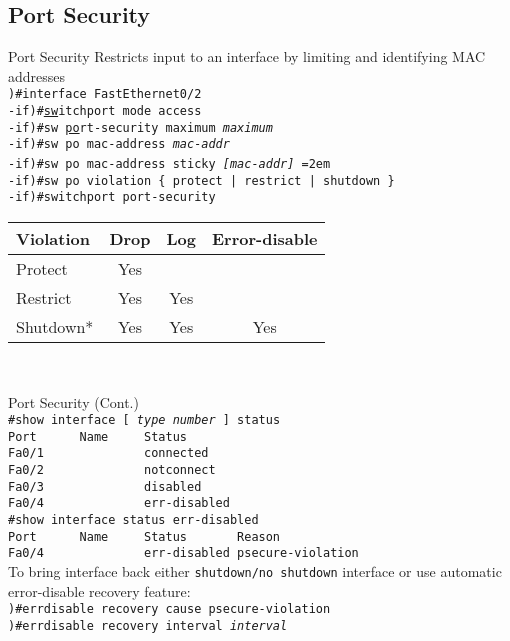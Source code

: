 \subsection{Port Security}
\begin{frame}{Port Security}
	Restricts input to an interface by limiting and identifying MAC addresses
	\vspace{0.3cm}
	\texttt{
		\\\pause )\#interface FastEthernet0/2
		\\\pause -if)\#\underline{sw}itchport mode access
		\\\pause -if)\#sw \underline{po}rt-security maximum \textit{maximum}
		\\\pause -if)\#sw po mac-address \textit{mac-addr}
		\\\pause -if)\#sw po mac-address sticky \pause\textit{[mac-addr]}
		\hangindent=2em{
		\\\pause -if)\#sw po violation \{ protect | restrict | shutdown \}}
		\\\pause -if)\#switchport port-security
	}
	\\\vspace{0.1cm}\hspace{1.5cm}
	\begin{tabular}{l*{3}c}
		        \pause Violation	&Drop	&Log	&Error-disable
		\\\hline\pause Protect		&Yes
		\\      \pause Restrict		&Yes	&Yes
		\\      \pause Shutdown*		&Yes	&Yes	&Yes
	\end{tabular}\\
\end{frame}

\begin{frame}{Port Security (Cont.)}
	\texttt{
		\\\#show interface [\textit{ type number }] status
		\\\pause Port~~~~~~Name~~~~~Status
		\\       Fa0/1~~~~~~~~~~~~~~connected
		\\       Fa0/2~~~~~~~~~~~~~~notconnect
		\\       Fa0/3~~~~~~~~~~~~~~disabled
		\\       Fa0/4~~~~~~~~~~~~~~err-disabled\vspace{0.3cm}
		\\\pause \#show interface status err-disabled
		\\\pause Port~~~~~~Name~~~~~Status~~~~~~~Reason
		\\       Fa0/4~~~~~~~~~~~~~~err-disabled~psecure-violation
	}
	\\\vspace{0.3cm}\pause
	To bring interface back either \texttt{shutdown/no shutdown} interface or use automatic error-disable recovery feature:
	\pause\vspace{0.3cm}
	\texttt{
		\\)\#errdisable recovery cause psecure-violation
		\\)\#errdisable recovery interval \textit{interval}
	}\\
\end{frame}
